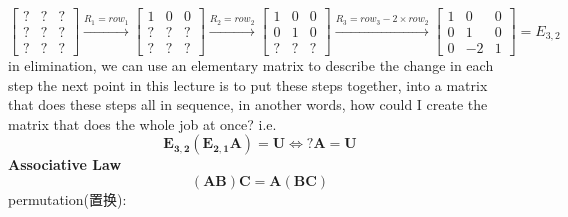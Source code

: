 \documentclass[12pt, a4paper]{article}
\begin{document}
\begin{math}
	\begin{bmatrix}
		? & ? & ? \\
		? & ? & ? \\
		? & ? & ? 
	\end{bmatrix}
	\xrightarrow[]{R_1=row_1}
	\begin{bmatrix}
		1 & 0 & 0 \\
		? & ? & ? \\
		? & ? & ? 
	\end{bmatrix}
	\xrightarrow[]{R_2=row_2}
	\begin{bmatrix}
		1 & 0 & 0 \\
		0 & 1 & 0 \\
		? & ? & ? 
	\end{bmatrix}
	\xrightarrow[]{R_3 = row_3 - 2 \times row_2}
	\begin{bmatrix}
		1 & 0 & 0 \\
		0 & 1 & 0 \\
		0 & -2 & 1 
	\end{bmatrix}
	 = 
	E_{3,2}
\end{math}
\vspace{14pt}
\newline
in elimination, we can use an elementary matrix to describe the change in each step
\vspace{14pt}
\newline
the next point in this lecture is to put these steps together, into a matrix that does these steps all in sequence, in another words, how could I create the matrix that does the whole job at once? i.e.
\begin{displaymath}
	{\mathbf{E_{3,2}}}({\mathbf{E_{2,1}}}{\mathbf{A}}) = {\mathbf{U}} \Longleftrightarrow {\mathbf{\boxed{?}}}{\mathbf{A}} = {\mathbf{U}}
\end{displaymath}
\vspace{14pt}
\newline
{\bf{Associative Law}}
\begin{displaymath}
	({\mathbf{A}}{\mathbf{B}}){\mathbf{C}} = {\mathbf{A}}({\mathbf{B}}{\mathbf{C}})
\end{displaymath}
\vspace{14pt}
\newline
permutation(置换): 
\end{document}
